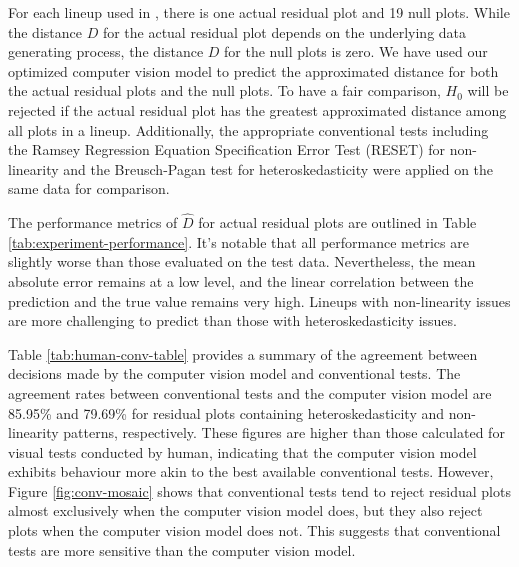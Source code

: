 \documentclass[]{interact}
\theoremstyle{plain}%
\theoremstyle{definition}
\theoremstyle{remark}
\begin{document}
For each lineup used in \citet{li2023plot}, there is one actual residual
plot and 19 null plots. While the distance \(D\) for the actual residual
plot depends on the underlying data generating process, the distance
\(D\) for the null plots is zero. We have used our optimized computer
vision model to predict the approximated distance for both the actual
residual plots and the null plots. To have a fair comparison, \(H_0\)
will be rejected if the actual residual plot has the greatest
approximated distance among all plots in a lineup. Additionally, the
appropriate conventional tests including the Ramsey Regression Equation
Specification Error Test (RESET) \citep{ramsey1969tests} for
non-linearity and the Breusch-Pagan test \citep{breusch1979simple} for
heteroskedasticity were applied on the same data for comparison.

The performance metrics of \(\hat{D}\) for actual residual plots are
outlined in Table \ref{tab:experiment-performance}. It's notable that
all performance metrics are slightly worse than those evaluated on the
test data. Nevertheless, the mean absolute error remains at a low level,
and the linear correlation between the prediction and the true value
remains very high. Lineups with non-linearity issues are more
challenging to predict than those with heteroskedasticity issues.

Table \ref{tab:human-conv-table} provides a summary of the agreement
between decisions made by the computer vision model and conventional
tests. The agreement rates between conventional tests and the computer
vision model are 85.95\% and 79.69\% for residual plots containing
heteroskedasticity and non-linearity patterns, respectively. These
figures are higher than those calculated for visual tests conducted by
human, indicating that the computer vision model exhibits behaviour more
akin to the best available conventional tests. However, Figure
\ref{fig:conv-mosaic} shows that conventional tests tend to reject
residual plots almost exclusively when the computer vision model does,
but they also reject plots when the computer vision model does not. This
suggests that conventional tests are more sensitive than the computer
vision model.
\end{document}
